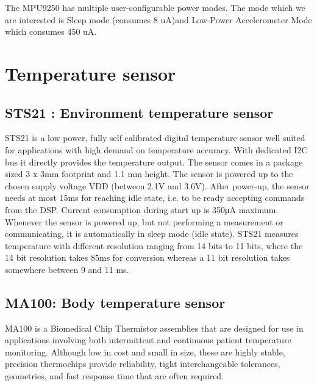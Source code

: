 \hspace{10mm}The MPU9250 has multiple user-configurable power modes. The mode which we are interested is Sleep mode (consumes 8 uA)and Low-Power Accelerometer Mode which consumes 450 uA. 
 
\section{Temperature sensor}
\subsection{ STS21 : Environment temperature sensor}
STS21 is a low power, fully self calibrated digital temperature sensor well suited for applications with high demand on temperature accuracy. With dedicated I2C bus it directly provides the temperature output. The sensor comes in a package sized 3 x 3mm footprint and 1.1 mm height. The sensor is powered up to the chosen supply voltage VDD (between 2.1V and 3.6V). After power-up, the sensor needs at most 15ms for reaching idle state, i.e. to be ready accepting commands from the DSP. Current consumption during start up is 350μA maximum. Whenever the sensor is powered up, but not performing a measurement or communicating, it is automatically in sleep mode (idle state). STS21 measures temperature with different resolution ranging from 14 bits to 11 bits, where the 14 bit resolution takes 85ms for conversion whereas a 11 bit resolution takes somewhere between 9 and 11 ms.  

\subsection{MA100: Body temperature sensor} 
MA100 is a Biomedical Chip Thermistor assemblies that are designed for use in applications involving both intermittent and continuous patient temperature monitoring. Although low in cost and small in size, these are highly stable, precision thermochips provide reliability, tight interchangeable tolerances, geometries, and fast response time that are often required.
 
